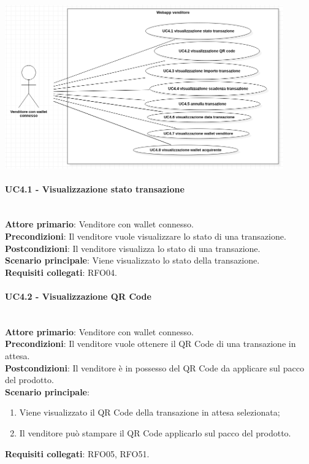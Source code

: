 \documentclass[a4paper, 12pt]{article}
\begin{document}
\includegraphics[width=0.9\textwidth]{UC_WAV4}

\paragraph{UC4.1 - Visualizzazione stato transazione}\\
\textbf{Attore primario}: Venditore con wallet connesso.\\
\textbf{Precondizioni}: Il venditore vuole visualizzare lo stato di una transazione.\\
\textbf{Postcondizioni}: Il venditore visualizza lo stato di una transazione.\\
\textbf{Scenario principale}: Viene visualizzato lo stato della transazione.\\
\textbf{Requisiti collegati}: RFO04.

\paragraph{UC4.2 - Visualizzazione QR Code}\\
\textbf{Attore primario}: Venditore con wallet connesso.\\
\textbf{Precondizioni}: Il venditore vuole ottenere il QR Code di una transazione in attesa.\\
\textbf{Postcondizioni}: Il venditore è in possesso del QR Code da applicare sul pacco del prodotto.\\
\textbf{Scenario principale}:
\begin{enumerate}
\item Viene visualizzato il QR Code della transazione in attesa selezionata;
\item Il venditore può stampare il QR Code applicarlo sul pacco del prodotto.
\end{enumerate}
\textbf{Requisiti collegati}: RFO05, RFO51.
\end{document}
